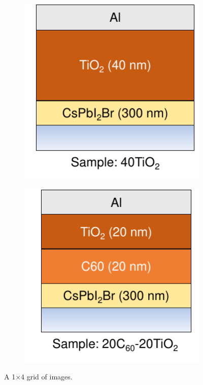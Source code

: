 \begin{figure}[htbp]
\begin{subfigure}{0.24\textwidth}
        \caption{}
        \label{}
    \end{subfigure}
    \hfill
    \begin{subfigure}{0.24\textwidth}
        \centering
        \includegraphics[width=\textwidth]{chapters/transport_layers/images/ETL_Optimization_40TiO2.pdf}
        \caption{}
        \label{}
    \end{subfigure}
    \hfill
    \begin{subfigure}{0.24\textwidth}
        \centering
        \includegraphics[width=\textwidth]{chapters/transport_layers/images/ETL_Optimization_20_20.pdf}
        \caption{}
        \label{}
    \end{subfigure}
    
    \caption{A 1×4 grid of images.}
    \label{}
\end{figure}
